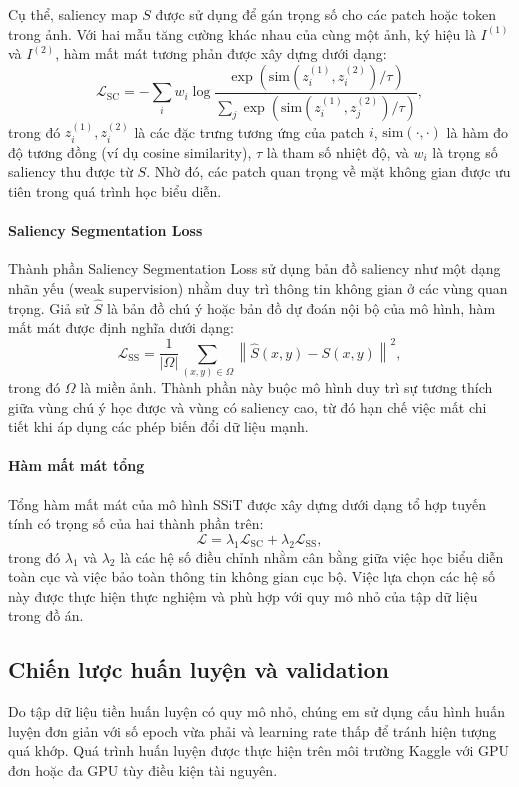 Cụ thể, saliency map $S$ được sử dụng để gán trọng số cho các patch hoặc token trong ảnh. Với hai mẫu tăng cường khác nhau của cùng một ảnh, ký hiệu là $I^{(1)}$ và $I^{(2)}$, hàm mất mát tương phản được xây dựng dưới dạng:
\[
\mathcal{L}_{\text{SC}} = 
- \sum_{i} w_i \log 
\frac{\exp(\mathrm{sim}(z_i^{(1)}, z_i^{(2)}) / \tau)}
{\sum_{j} \exp(\mathrm{sim}(z_i^{(1)}, z_j^{(2)}) / \tau)},
\]
trong đó $z_i^{(1)}, z_i^{(2)}$ là các đặc trưng tương ứng của patch $i$, $\mathrm{sim}(\cdot,\cdot)$ là hàm đo độ tương đồng (ví dụ cosine similarity), $\tau$ là tham số nhiệt độ, và $w_i$ là trọng số saliency thu được từ $S$. Nhờ đó, các patch quan trọng về mặt không gian được ưu tiên trong quá trình học biểu diễn.

\paragraph{Saliency Segmentation Loss}
Thành phần Saliency Segmentation Loss sử dụng bản đồ saliency như một dạng nhãn yếu (weak supervision) nhằm duy trì thông tin không gian ở các vùng quan trọng. Giả sử $\hat{S}$ là bản đồ chú ý hoặc bản đồ dự đoán nội bộ của mô hình, hàm mất mát được định nghĩa dưới dạng:
\[
\mathcal{L}_{\text{SS}} = \frac{1}{|\Omega|} \sum_{(x,y) \in \Omega}
\left\| \hat{S}(x,y) - S(x,y) \right\|^2,
\]
trong đó $\Omega$ là miền ảnh. Thành phần này buộc mô hình duy trì sự tương thích giữa vùng chú ý học được và vùng có saliency cao, từ đó hạn chế việc mất chi tiết khi áp dụng các phép biến đổi dữ liệu mạnh.

\paragraph{Hàm mất mát tổng}
Tổng hàm mất mát của mô hình SSiT được xây dựng dưới dạng tổ hợp tuyến tính có trọng số của hai thành phần trên:
\[
\mathcal{L} = \lambda_1 \mathcal{L}_{\text{SC}} + \lambda_2 \mathcal{L}_{\text{SS}},
\]
trong đó $\lambda_1$ và $\lambda_2$ là các hệ số điều chỉnh nhằm cân bằng giữa việc học biểu diễn toàn cục và việc bảo toàn thông tin không gian cục bộ. Việc lựa chọn các hệ số này được thực hiện thực nghiệm và phù hợp với quy mô nhỏ của tập dữ liệu trong đồ án.

\subsection{Chiến lược huấn luyện và validation}

Do tập dữ liệu tiền huấn luyện có quy mô nhỏ, chúng em sử dụng cấu hình huấn luyện đơn giản với số epoch vừa phải và learning rate thấp để tránh hiện tượng quá khớp. Quá trình huấn luyện được thực hiện trên môi trường Kaggle với GPU đơn hoặc đa GPU tùy điều kiện tài nguyên.

